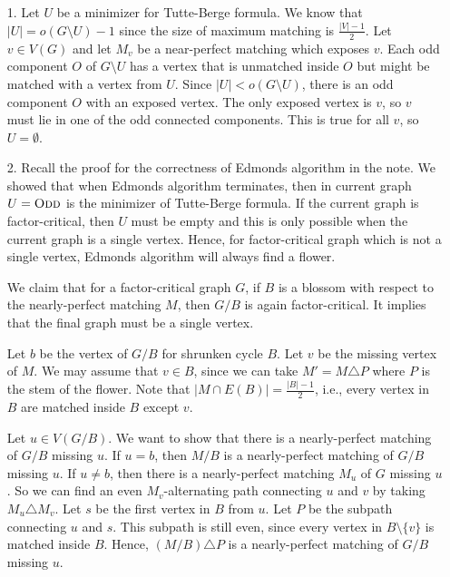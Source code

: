 \documentclass[12pt]{article}
\begin{document}
\begin{enumerate}
\begin{itemize}
\item[1.] Let $U$ be a minimizer for Tutte-Berge formula. We know that $|U| = o(G\setminus U) - 1$ since the size of maximum matching is $\frac{|V|-1}{2}$. Let $v \in V(G)$ and let $M_v$ be a near-perfect matching which exposes $v$. Each odd component $O$ of $G\setminus U$ has a vertex that is unmatched inside $O$ but might be matched with a vertex from $U$. Since $|U| < o(G\setminus U)$, there is an odd component $O$ with an exposed vertex. The only exposed vertex is $v$, so $v$ must lie in one of the odd connected components.
    This is true for all $v$, so $U = \emptyset$.

\item[2.]
Recall the proof for the correctness of Edmonds algorithm in the note. We showed that when Edmonds algorithm terminates, then in current graph $U = \textsc{Odd}$ is the minimizer of Tutte-Berge formula. If the current graph is factor-critical, then $U$ must be empty and this is only possible when the current graph is a single vertex. Hence, for factor-critical graph which is not a single vertex, Edmonds algorithm will always find a flower.

We claim that for a factor-critical graph $G$, if $B$ is a blossom with respect to the nearly-perfect matching $M$, %
then $G/B$ is again factor-critical. It implies that the final graph must be a single vertex.

Let $b$ be the vertex of $G/B$ for shrunken cycle $B$. Let $v$ be the missing vertex of $M$. We may assume that $v \in B$, since we can take $M' = M \triangle P$ where $P$ is the stem of the flower. Note that $|M \cap E(B)| = \frac{|B|-1}{2}$, i.e., every vertex in $B$ are matched inside $B$ except $v$.

Let $u \in V(G/B)$. We want to show that there is a nearly-perfect matching of $G/B$ missing $u$. If $u = b$, then $M/B$ is a nearly-perfect matching of $G/B$ missing $u$. If $u \neq b$, then there is a nearly-perfect matching $M_u$ of $G$ missing $u$. So we can find an even $M_v$-alternating path connecting $u$ and $v$ by taking $M_u \triangle M_v$. Let $s$ be the first vertex in $B$ from $u$. Let $P$ be the subpath connecting $u$ and $s$. This subpath is still even, since every vertex in $B \setminus \{v\}$ is matched inside $B$. Hence, $(M/B) \triangle P$ is a nearly-perfect matching of $G/B$ missing $u$.


\end{itemize}
\end{enumerate}
\end{document}
